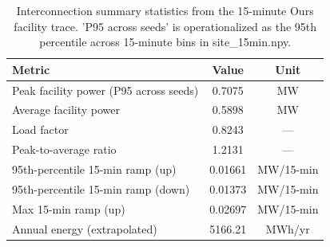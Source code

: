 \begin{table}[t]
\centering
\small
\caption{Interconnection summary statistics from the 15-minute Ours facility trace. 'P95 across seeds' is operationalized as the 95th percentile across 15-minute bins in site\_15min.npy.}
\label{tab:interconnection-summary}
\vspace{0.4em}
\begin{tabular}{lcc}
\toprule
\textbf{Metric} & \textbf{Value} & \textbf{Unit} \\
\midrule
Peak facility power (P95 across seeds) & 0.7075 & MW \\
Average facility power & 0.5898 & MW \\
Load factor & 0.8243 & --- \\
Peak-to-average ratio & 1.2131 & --- \\
95th-percentile 15-min ramp (up) & 0.01661 & MW/15-min \\
95th-percentile 15-min ramp (down) & 0.01373 & MW/15-min \\
Max 15-min ramp (up) & 0.02697 & MW/15-min \\
Annual energy (extrapolated) & 5166.21 & MWh/yr \\
\bottomrule
\end{tabular}
\end{table}
